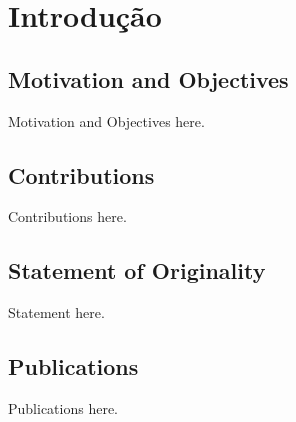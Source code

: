 \chapter{Introdução}

\section{Motivation and Objectives}

Motivation and Objectives here.



\section{Contributions}

Contributions here.


\section{Statement of Originality}

Statement here.


\section{Publications}

Publications here.